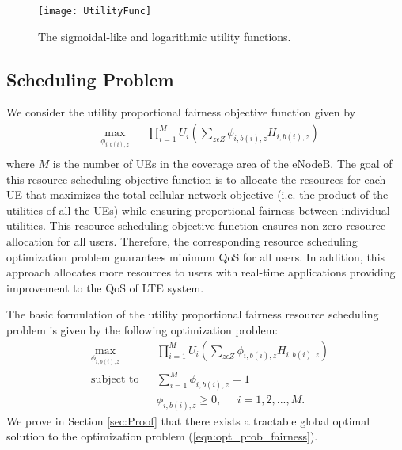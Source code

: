 \documentclass[conference]{IEEEtran}
\begin{document}
\begin{figure}
    \centering
    \texttt{[image: UtilityFunc]}
    \caption{The sigmoidal-like and logarithmic utility functions.}
    \label{fig:SigLogUtility}
\end{figure} 

\subsection{Scheduling Problem}\label{sec:scheduling}

We consider the utility proportional fairness objective function given by 
\begin{equation}\label{eqn:utility_fairness}
\begin{aligned}
& \underset{\textbf{$\phi_{i,b(i),z}$}} {\text{max}}
& & \prod_{i=1}^{M}U_i(\sum_{z\epsilon Z}\phi_{i,b(i),z} H_{i,b(i),z}) \\
\end{aligned}
\end{equation}
where $M$ is the number of UEs in the coverage area of the eNodeB. The goal of this resource scheduling objective function is to allocate the resources for each UE that maximizes the total cellular network objective (i.e. the product of the utilities of all the UEs) while ensuring proportional fairness between individual utilities. This resource scheduling objective function ensures non-zero resource allocation for all users. Therefore, the corresponding resource scheduling optimization problem guarantees minimum QoS for all users. In addition, this approach allocates more resources to users with real-time applications providing improvement to the QoS of LTE system. 


The basic formulation of the utility proportional fairness resource scheduling problem is given by the following optimization problem:
\begin{equation}\label{eqn:opt_prob_fairness}
\begin{aligned}
& \underset{\textbf{$\phi_{i,b(i),z}$}} {\text{max}}
& & \prod_{i=1}^{M}U_i(\sum_{z\epsilon Z}\phi_{i,b(i),z} H_{i,b(i),z}) \\
& \text{subject to}
& & \sum_{i=1}^{M}\phi_{i,b(i),z} =1\\
& & &  \phi_{i,b(i),z} \geq 0, \;\;\;\;\; i = 1,2, ...,M.
\end{aligned}
\end{equation}
We prove in Section \ref{sec:Proof} that there exists a tractable global optimal solution to the optimization problem (\ref{eqn:opt_prob_fairness}).
\end{document}
